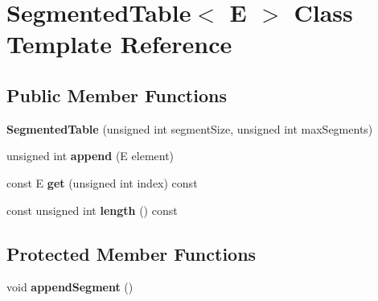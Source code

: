 \hypertarget{class_segmented_table}{}\section{Segmented\+Table$<$ E $>$ Class Template Reference}
\label{class_segmented_table}
\subsection*{Public Member Functions}
\begin{DoxyCompactItemize}
\item 
\hypertarget{class_segmented_table_afd8294915917a475e8ff93161b092604}{}{\bfseries Segmented\+Table} (unsigned int segment\+Size, unsigned int max\+Segments)\label{class_segmented_table_afd8294915917a475e8ff93161b092604}

\item 
\hypertarget{class_segmented_table_a680bdc05599596d5a710b0f4c7cf3ab9}{}unsigned int {\bfseries append} (E element)\label{class_segmented_table_a680bdc05599596d5a710b0f4c7cf3ab9}

\item 
\hypertarget{class_segmented_table_a2432ab71e053f677d9c13b5e594c471f}{}const E {\bfseries get} (unsigned int index) const \label{class_segmented_table_a2432ab71e053f677d9c13b5e594c471f}

\item 
\hypertarget{class_segmented_table_aa542abf97267fb84faf0bbde3ef7fe50}{}const unsigned int {\bfseries length} () const \label{class_segmented_table_aa542abf97267fb84faf0bbde3ef7fe50}

\end{DoxyCompactItemize}
\subsection*{Protected Member Functions}
\begin{DoxyCompactItemize}
\item 
\hypertarget{class_segmented_table_ab26fb7177a2e09002e86dfe2b0306e1e}{}void {\bfseries append\+Segment} ()\label{class_segmented_table_ab26fb7177a2e09002e86dfe2b0306e1e}

\end{DoxyCompactItemize}
